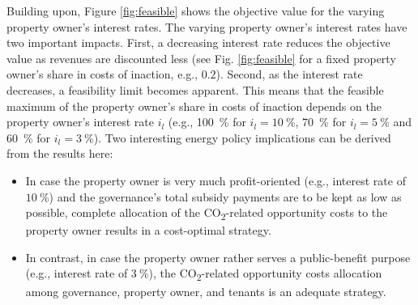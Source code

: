 Building upon, Figure \ref{fig:feasible} shows the objective value for the varying property owner's interest rates. The varying property owner's interest rates have two important impacts. First, a decreasing interest rate reduces the objective value as revenues are discounted less (see Fig. \ref{fig:feasible} for a fixed property owner's share in costs of inaction, e.g., $0.2$). Second, as the interest rate decreases, a feasibility limit becomes apparent. This means that the feasible maximum of the property owner's share in costs of inaction depends on the property owner's interest rate $i_l$ (e.g., \SI{100}{\%} for $i_l=\SI{10}{\%}$, \SI{70}{\%} for $i_l=\SI{5}{\%}$ and \SI{60}{\%} for $i_l=\SI{3}{\%}$). Two interesting energy policy implications can be derived from the results here:
\begin{itemize}
	\item In case the property owner is very much profit-oriented (e.g., interest rate of $\SI{10}{\%}$) and the governance's total subsidy payments are to be kept as low as possible, complete allocation of the CO\textsubscript{2}-related opportunity costs to the property owner results in a cost-optimal strategy.
	\item In contrast, in case the property owner rather serves a public-benefit purpose (e.g., interest rate of $\SI{3}{\%}$), the CO\textsubscript{2}-related opportunity costs allocation among governance, property owner, and tenants is an adequate strategy.
\end{itemize}

\begin{table}
	\centering
	\setlength{\extrarowheight}{.5em}
	\caption{}
	\label{tab:co2allocation}
\end{table}

